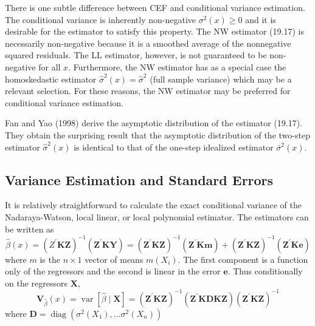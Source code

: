 \documentclass[10pt]{article}
\begin{document}
There is one subtle difference between CEF and conditional variance estimation. The conditional variance is inherently non-negative $\sigma^{2}(x) \geq 0$ and it is desirable for the estimator to satisfy this property. The NW estimator (19.17) is necessarily non-negative because it is a smoothed average of the nonnegative squared residuals. The LL estimator, however, is not guaranteed to be non-negative for all $x$. Furthermore, the NW estimator has as a special case the homoskedastic estimator $\widehat{\sigma}^{2}(x)=\widehat{\sigma}^{2}$ (full sample variance) which may be a relevant selection. For these reasons, the NW estimator may be preferred for conditional variance estimation.

Fan and Yao (1998) derive the asymptotic distribution of the estimator (19.17). They obtain the surprising result that the asymptotic distribution of the two-step estimator $\widehat{\sigma}^{2}(x)$ is identical to that of the one-step idealized estimator $\bar{\sigma}^{2}(x)$.

\subsection{Variance Estimation and Standard Errors}
It is relatively straightforward to calculate the exact conditional variance of the Nadaraya-Watson, local linear, or local polynomial estimator. The estimators can be written as
$$
\widehat{\beta}(x)=\left(Z^{\prime} \boldsymbol{K} \boldsymbol{Z}\right)^{-1}\left(\boldsymbol{Z}^{\prime} \boldsymbol{K} \boldsymbol{Y}\right)=\left(\boldsymbol{Z}^{\prime} \boldsymbol{K} \boldsymbol{Z}\right)^{-1}\left(\boldsymbol{Z}^{\prime} \boldsymbol{K} \boldsymbol{m}\right)+\left(\boldsymbol{Z}^{\prime} \boldsymbol{K} \boldsymbol{Z}\right)^{-1}\left(\boldsymbol{Z}^{\prime} \boldsymbol{K} \boldsymbol{e}\right)
$$
where $m$ is the $n \times 1$ vector of means $m\left(X_{i}\right)$. The first component is a function only of the regressors and the second is linear in the error $\boldsymbol{e}$. Thus conditionally on the regressors $\boldsymbol{X}$,
$$
\boldsymbol{V}_{\widehat{\beta}}(x)=\operatorname{var}[\widehat{\beta} \mid \boldsymbol{X}]=\left(\boldsymbol{Z}^{\prime} \boldsymbol{K} \boldsymbol{Z}\right)^{-1}\left(\boldsymbol{Z}^{\prime} \boldsymbol{K} \boldsymbol{D} \boldsymbol{K} \boldsymbol{Z}\right)\left(\boldsymbol{Z}^{\prime} \boldsymbol{K} \boldsymbol{Z}\right)^{-1}
$$
where $\boldsymbol{D}=\operatorname{diag}\left(\sigma^{2}\left(X_{1}\right), \ldots \sigma^{2}\left(X_{n}\right)\right)$
\end{document}

